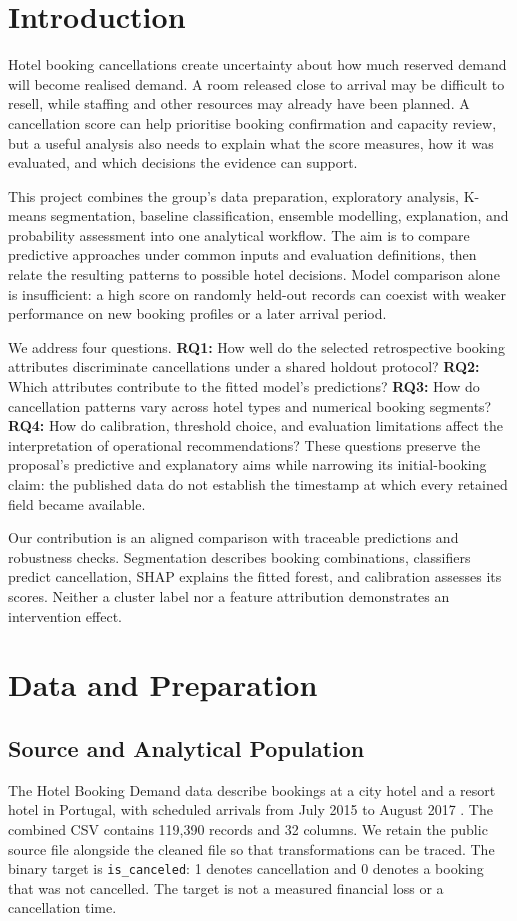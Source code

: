 \section{Introduction}
Hotel booking cancellations create uncertainty about how much reserved demand will become realised demand. A room released close to arrival may be difficult to resell, while staffing and other resources may already have been planned. A cancellation score can help prioritise booking confirmation and capacity review, but a useful analysis also needs to explain what the score measures, how it was evaluated, and which decisions the evidence can support.

This project combines the group's data preparation, exploratory analysis, K-means segmentation, baseline classification, ensemble modelling, explanation, and probability assessment into one analytical workflow. The aim is to compare predictive approaches under common inputs and evaluation definitions, then relate the resulting patterns to possible hotel decisions. Model comparison alone is insufficient: a high score on randomly held-out records can coexist with weaker performance on new booking profiles or a later arrival period.

We address four questions. \textbf{RQ1:} How well do the selected retrospective booking attributes discriminate cancellations under a shared holdout protocol? \textbf{RQ2:} Which attributes contribute to the fitted model's predictions? \textbf{RQ3:} How do cancellation patterns vary across hotel types and numerical booking segments? \textbf{RQ4:} How do calibration, threshold choice, and evaluation limitations affect the interpretation of operational recommendations? These questions preserve the proposal's predictive and explanatory aims while narrowing its initial-booking claim: the published data do not establish the timestamp at which every retained field became available.

Our contribution is an aligned comparison with traceable predictions and robustness checks. Segmentation describes booking combinations, classifiers predict cancellation, SHAP explains the fitted forest, and calibration assesses its scores. Neither a cluster label nor a feature attribution demonstrates an intervention effect.

\section{Data and Preparation}
\subsection{Source and Analytical Population}
The Hotel Booking Demand data describe bookings at a city hotel and a resort hotel in Portugal, with scheduled arrivals from July 2015 to August 2017 \citep{antonio2019}. The combined CSV contains 119,390 records and 32 columns. We retain the public source file alongside the cleaned file so that transformations can be traced. The binary target is \texttt{is\_canceled}: 1 denotes cancellation and 0 denotes a booking that was not cancelled. The target is not a measured financial loss or a cancellation time.

